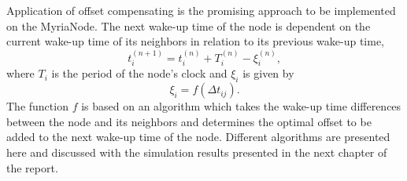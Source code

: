 \documentclass[a4paper,10pt]{report}
\begin{document}
Application of offset compensating is the promising approach to be
implemented on the MyriaNode. The next wake-up time of the node is
dependent on the current wake-up time of its neighbors in relation
to its previous wake-up time,
\begin{equation}
t_i^{(n+1)} = t_i^{(n)} + T_i^{(n)} - \xi_i^{(n)} ,
\end{equation}
where $T_i$ is the period of the node's clock and $\xi_i$ is given
by
\begin{equation}
\xi_i = f(\Delta t_{ij}).
\end{equation}
The function $f$ is based on an algorithm which takes the wake-up
time differences between the node and its neighbors and determines
the optimal offset to be added to the next wake-up time of the node.
\newline Different algorithms are presented here and discussed with the
simulation results presented in the next chapter of the report.\newline
\end{document}
